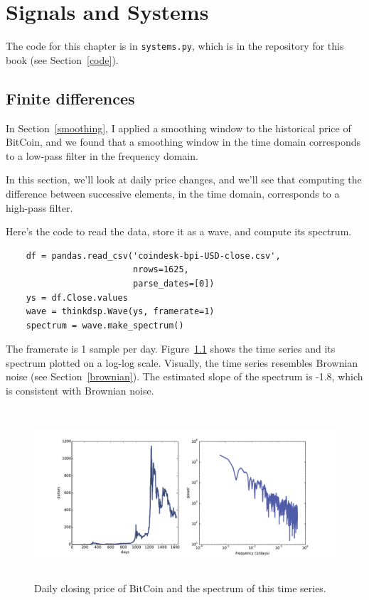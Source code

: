 \documentclass[12pt]{book}
\begin{document}
\chapter{Signals and Systems}
\label{systems}

The code for this chapter is in {\tt systems.py}, which is in the
repository for this book (see Section~\ref{code}).


\section{Finite differences}

In Section~\ref{smoothing}, I applied a smoothing window to
the historical price of BitCoin, and we found that a smoothing
window in the time domain corresponds to a low-pass filter in
the frequency domain.

In this section, we'll look at daily price changes, and we'll
see that computing the difference between successive elements,
in the time domain, corresponds to a high-pass filter.

Here's the code to read the data, store it as a wave, and compute its
spectrum.

\begin{verbatim}
    df = pandas.read_csv('coindesk-bpi-USD-close.csv', 
                         nrows=1625, 
                         parse_dates=[0])
    ys = df.Close.values
    wave = thinkdsp.Wave(ys, framerate=1)
    spectrum = wave.make_spectrum()
\end{verbatim}

The framerate is 1 sample per day.  Figure~\ref{fig.systems1} shows
the time series and its spectrum plotted on a log-log scale.
Visually, the time series resembles Brownian noise (see
Section~\ref{brownian}).  The estimated slope of the spectrum is -1.8,
which is consistent with Brownian noise.

\begin{figure}
\centerline{\includegraphics[height=2.5in]{figs/systems1.pdf}}
\caption{Daily closing price of BitCoin and the spectrum of this time
  series.}
\label{fig.systems1}
\end{figure}
\end{document}
